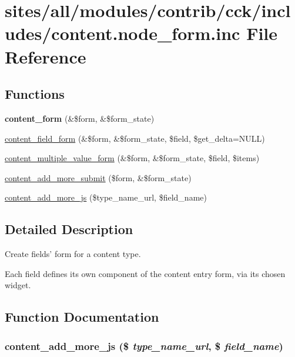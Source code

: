 \hypertarget{content_8node__form_8inc}{
\section{sites/all/modules/contrib/cck/includes/content.node\_\-form.inc File Reference}
\label{content_8node__form_8inc}
}
\subsection*{Functions}
\begin{CompactItemize}
\item 
\hypertarget{content_8node__form_8inc_0148930471e8b619f05e90f412ad006b}{
\textbf{content\_\-form} (\&\$form, \&\$form\_\-state)}
\label{content_8node__form_8inc_0148930471e8b619f05e90f412ad006b}

\item 
\hyperlink{content_8node__form_8inc_71a4a36ac11328e4421fbfab0d61ce53}{content\_\-field\_\-form} (\&\$form, \&\$form\_\-state, \$field, \$get\_\-delta=NULL)
\item 
\hyperlink{content_8node__form_8inc_2b35316dcffea9939af18ab1a24b5ab8}{content\_\-multiple\_\-value\_\-form} (\&\$form, \&\$form\_\-state, \$field, \$items)
\item 
\hyperlink{content_8node__form_8inc_7a3e05d2af0db78a12f4da6389c65f4e}{content\_\-add\_\-more\_\-submit} (\$form, \&\$form\_\-state)
\item 
\hyperlink{content_8node__form_8inc_e0819b693cd927505231ced9dfc0150e}{content\_\-add\_\-more\_\-js} (\$type\_\-name\_\-url, \$field\_\-name)
\end{CompactItemize}


\subsection{Detailed Description}
Create fields' form for a content type.

Each field defines its own component of the content entry form, via its chosen widget. 

\subsection{Function Documentation}
\hypertarget{content_8node__form_8inc_e0819b693cd927505231ced9dfc0150e}{
\subsubsection[{content\_\-add\_\-more\_\-js}]{\setlength{\rightskip}{0pt plus 5cm}content\_\-add\_\-more\_\-js (\$ {\em type\_\-name\_\-url}, \/  \$ {\em field\_\-name})}}
\label{content_8node__form_8inc_e0819b693cd927505231ced9dfc0150e}


